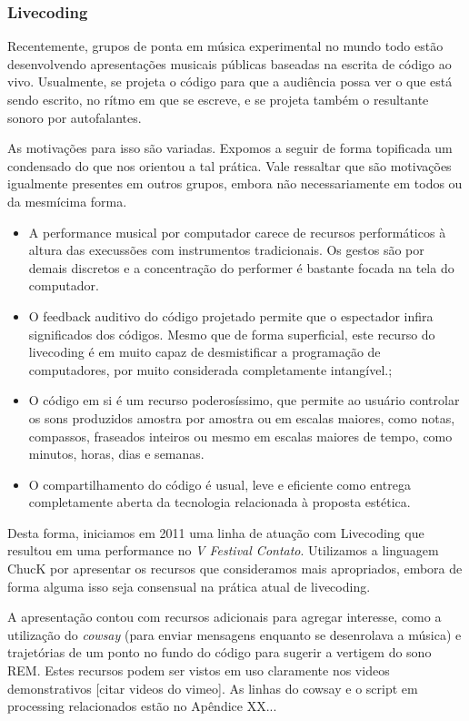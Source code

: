         \subsubsection{Livecoding}

Recentemente, grupos de ponta em música experimental no mundo todo estão
desenvolvendo apresentações musicais públicas baseadas na escrita
de código ao vivo. Usualmente, se projeta o código para que a audiência possa
ver o que está sendo escrito, no rítmo em que se escreve, e se projeta também
o resultante sonoro por autofalantes.

As motivações para isso são variadas. Expomos a seguir de forma topificada
um condensado do que nos orientou a tal prática. Vale ressaltar que são
motivações igualmente presentes em outros grupos, embora não necessariamente
em todos ou da mesmícima forma.

\begin{itemize}
    \item A performance musical por computador carece de recursos performáticos
    à altura das execussões com instrumentos tradicionais. Os gestos são por demais
    discretos e a concentração do performer é bastante focada na tela do computador.
    \item O feedback auditivo do código projetado permite que o espectador infira
    significados dos códigos. Mesmo que de forma superficial, este recurso do livecoding
    é em muito capaz de desmistificar a programação de computadores, por muito considerada
    completamente intangível.;
    \item O código em si é um recurso poderosíssimo, que permite ao usuário controlar
    os sons produzidos amostra por amostra ou em escalas maiores, como notas, compassos, fraseados
    inteiros ou mesmo em escalas maiores de tempo, como minutos, horas, dias e semanas.
    \item O compartilhamento do código é usual, leve e eficiente como entrega completamente
    aberta da tecnologia relacionada à proposta estética.
\end{itemize}

Desta forma, iniciamos em 2011 uma linha de atuação com Livecoding que resultou em uma performance
no \emph{V Festival Contato}. Utilizamos a linguagem ChucK por apresentar os recursos que
consideramos mais apropriados, embora de forma alguma isso seja consensual na prática atual
de livecoding.

A apresentação contou com recursos adicionais para agregar interesse, como a utilização
do \emph{cowsay} (para enviar mensagens enquanto se desenrolava a música) e trajetórias
de um ponto no fundo do código para sugerir a vertigem do sono REM. Estes recursos
podem ser vistos em uso claramente nos videos demonstrativos [citar videos do vimeo].
As linhas do cowsay e o script em processing relacionados estão no Apêndice XX...

